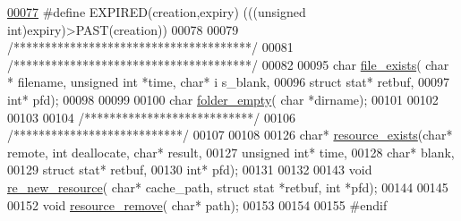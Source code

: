 \begin{DoxyCode}
\hypertarget{filesystem_8h_source_l00077}{}\hyperlink{filesystem_8h_aed5cf7a4e96374c4cde2e38ab06b2aec}{00077} \textcolor{preprocessor}{}\textcolor{preprocessor}{#define EXPIRED(creation,expiry)        (((unsigned int)expiry)>PAST(creation))}
00078 \textcolor{preprocessor}{}               
00079                                 \textcolor{comment}{/**************************************/}
00081                                 \textcolor{comment}{/**************************************/}
00082 
00095 \textcolor{keywordtype}{char}    \hyperlink{filesystem_8c_a65074cfd748ed70c0d9059845bdfcfaf}{file_exists}( \textcolor{keywordtype}{char} * filename, \textcolor{keywordtype}{unsigned} \textcolor{keywordtype}{int} *time, \textcolor{keywordtype}{char}*                 i
      s\_blank, 
00096                                                                                                                  
       \textcolor{keyword}{struct} stat*   retbuf, 
00097                                                                                                                  
       \textcolor{keywordtype}{int}*                   pfd);
00098 
00099 
00100 \textcolor{keywordtype}{char}    \hyperlink{filesystem_8c_a9f0c9e11c1f7e44a1311d85759e20b15}{folder_empty}( \textcolor{keywordtype}{char} *dirname);
00101 
00102 
00103 
00104                                         \textcolor{comment}{/***************************/}
00106                                         \textcolor{comment}{/***************************/}
00107 
00108 
00126 \textcolor{keywordtype}{char}*   \hyperlink{filesystem_8c_a5fe76e8b94c9acd4f281f70feaf475e9}{resource_exists}(\textcolor{keywordtype}{char}* remote, \textcolor{keywordtype}{int} deallocate, \textcolor{keywordtype}{char}*             result,
00127                                                                                                          
       \textcolor{keywordtype}{unsigned} \textcolor{keywordtype}{int}* time, 
00128                                                                                                          
       \textcolor{keywordtype}{char}*          blank, 
00129                                                                                                          
       \textcolor{keyword}{struct} stat*   retbuf, 
00130                                                                                                          
       \textcolor{keywordtype}{int}*                   pfd);
00131 
00132 
00143 \textcolor{keywordtype}{void}    \hyperlink{filesystem_8c_aa3d66f4f6df47fbd507644860c8655c8}{re_new_resource}( \textcolor{keywordtype}{char}* cache\_path, \textcolor{keyword}{struct} stat *retbuf, \textcolor{keywordtype}{int} *pfd);
00144 
00145 
00152 \textcolor{keywordtype}{void}    \hyperlink{filesystem_8c_a171f1a6dc274a446c1c7b0be9125a86d}{resource_remove}( \textcolor{keywordtype}{char}* path);
00153 
00154 
00155 \textcolor{preprocessor}{#endif}
\end{DoxyCode}
